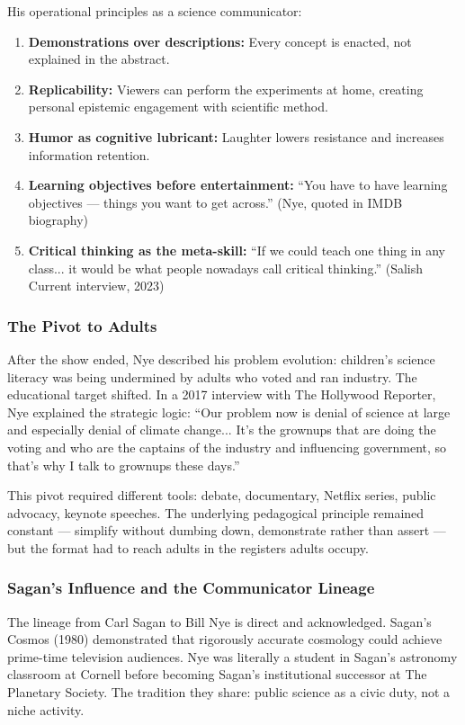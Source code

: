 \documentclass[11pt,letterpaper]{article}
\begin{document}
His operational principles as a science communicator:

\begin{enumerate}[leftmargin=*]
  \item \textbf{Demonstrations over descriptions:} Every concept is enacted, not explained in the abstract.
  \item \textbf{Replicability:} Viewers can perform the experiments at home, creating personal epistemic engagement with scientific method.
  \item \textbf{Humor as cognitive lubricant:} Laughter lowers resistance and increases information retention.
  \item \textbf{Learning objectives before entertainment:} ``You have to have learning objectives --- things you want to get across.'' (Nye, quoted in IMDB biography)
  \item \textbf{Critical thinking as the meta-skill:} ``If we could teach one thing in any class... it would be what people nowadays call critical thinking.'' (Salish Current interview, 2023)
\end{enumerate}

\subsubsection{The Pivot to Adults}

After the show ended, Nye described his problem evolution: children's science literacy was being undermined by adults who voted and ran industry. The educational target shifted. In a 2017 interview with The Hollywood Reporter, Nye explained the strategic logic: ``Our problem now is denial of science at large and especially denial of climate change... It's the grownups that are doing the voting and who are the captains of the industry and influencing government, so that's why I talk to grownups these days.''

This pivot required different tools: debate, documentary, Netflix series, public advocacy, keynote speeches. The underlying pedagogical principle remained constant --- simplify without dumbing down, demonstrate rather than assert --- but the format had to reach adults in the registers adults occupy.

\subsubsection{Sagan's Influence and the Communicator Lineage}

The lineage from Carl Sagan to Bill Nye is direct and acknowledged. Sagan's Cosmos (1980) demonstrated that rigorously accurate cosmology could achieve prime-time television audiences. Nye was literally a student in Sagan's astronomy classroom at Cornell before becoming Sagan's institutional successor at The Planetary Society. The tradition they share: public science as a civic duty, not a niche activity.
\end{document}
